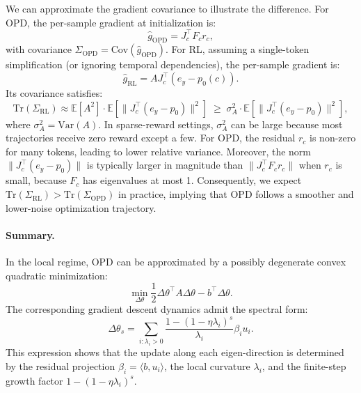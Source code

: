 \documentclass{article}
\begin{document}
We can approximate the gradient covariance to illustrate the difference. For OPD, the per-sample gradient at initialization is:
\begin{equation}
\hat{g}_{\mathrm{OPD}} = J_c^{\top} F_c r_c,
\end{equation}
with covariance \(\Sigma_{\mathrm{OPD}} = \mathrm{Cov}(\hat{g}_{\mathrm{OPD}})\). For RL, assuming a single-token simplification (or ignoring temporal dependencies), the per-sample gradient is:
\begin{equation}
\hat{g}_{\mathrm{RL}} = A J_c^{\top} (e_y - p_0(c)).
\end{equation}
Its covariance satisfies:
\begin{equation}
\mathrm{Tr}(\Sigma_{\mathrm{RL}}) \approx \mathbb{E}[A^2] \cdot \mathbb{E}[\|J_c^{\top}(e_y-p_0)\|^2] \;\ge\; \sigma_A^2 \cdot \mathbb{E}[\|J_c^{\top}(e_y-p_0)\|^2],
\end{equation}
where \(\sigma_A^2 = \mathrm{Var}(A)\). In sparse-reward settings, \(\sigma_A^2\) can be large because most trajectories receive zero reward except a few. For OPD, the residual \(r_c\) is non-zero for many tokens, leading to lower relative variance. Moreover, the norm \(\|J_c^{\top}(e_y-p_0)\|\) is typically larger in magnitude than \(\|J_c^{\top}F_c r_c\|\) when \(r_c\) is small, because \(F_c\) has eigenvalues at most 1. Consequently, we expect \(\mathrm{Tr}(\Sigma_{\mathrm{RL}}) > \mathrm{Tr}(\Sigma_{\mathrm{OPD}})\) in practice, implying that OPD follows a smoother and lower-noise optimization trajectory.

\paragraph{Summary.}
In the local regime, OPD can be approximated by a possibly degenerate convex quadratic minimization:
\begin{equation}
\min_{\Delta\theta}
\frac{1}{2}\Delta\theta^{\top}A\Delta\theta
-
b^{\top}\Delta\theta .
\end{equation}
The corresponding gradient descent dynamics admit the spectral form:
\begin{equation}
\Delta\theta_s
=
\sum_{i:\lambda_i>0}
\frac{1-(1-\eta\lambda_i)^s}{\lambda_i}
\beta_i u_i .
\end{equation}
This expression shows that the update along each eigen-direction is determined by the residual projection \(\beta_i=\langle b,u_i\rangle\), the local curvature \(\lambda_i\), and the finite-step growth factor \(1-(1-\eta\lambda_i)^s\).
\end{document}
